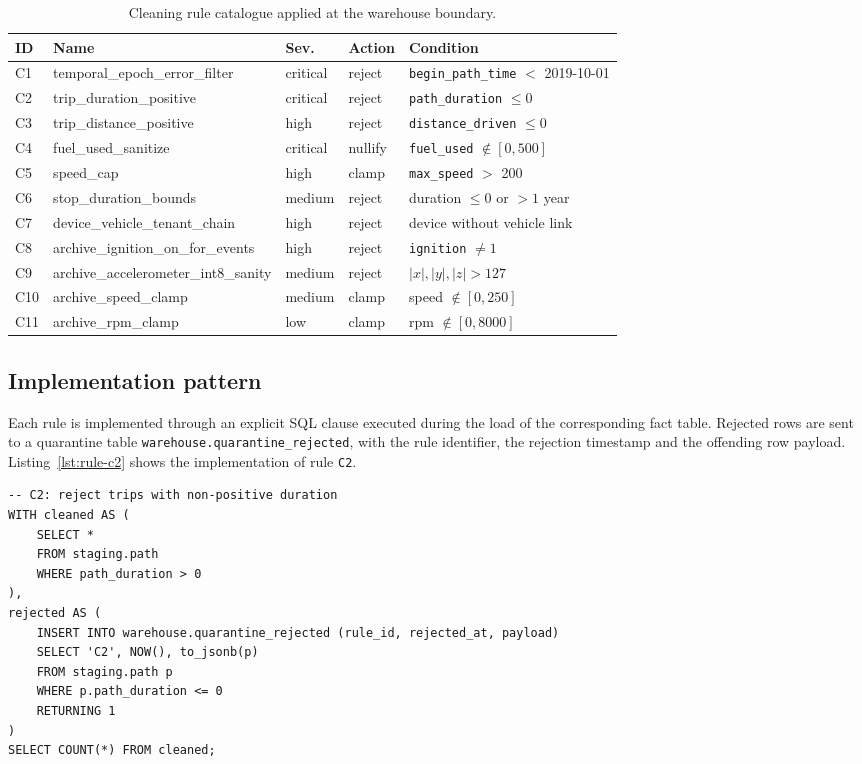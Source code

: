 \begin{table}[h]
\centering
\caption{Cleaning rule catalogue applied at the warehouse boundary.}
\label{tab:rules-prep}
\begin{tabular}{|l|l|l|l|p{5.4cm}|}
\hline
\textbf{ID} & \textbf{Name} & \textbf{Sev.} & \textbf{Action} & \textbf{Condition} \\
\hline
C1 & temporal\_epoch\_error\_filter & critical & reject & \texttt{begin\_path\_time} $<$ 2019-10-01 \\
C2 & trip\_duration\_positive & critical & reject & \texttt{path\_duration} $\le 0$ \\
C3 & trip\_distance\_positive & high & reject & \texttt{distance\_driven} $\le 0$ \\
C4 & fuel\_used\_sanitize & critical & nullify & \texttt{fuel\_used} $\notin [0, 500]$ \\
C5 & speed\_cap & high & clamp & \texttt{max\_speed} $>$ 200 \\
C6 & stop\_duration\_bounds & medium & reject & duration $\le 0$ or $> 1$ year \\
C7 & device\_vehicle\_tenant\_chain & high & reject & device without vehicle link \\
C8 & archive\_ignition\_on\_for\_events & high & reject & \texttt{ignition} $\ne 1$ \\
C9 & archive\_accelerometer\_int8\_sanity & medium & reject & $|x|, |y|, |z| > 127$ \\
C10 & archive\_speed\_clamp & medium & clamp & speed $\notin [0, 250]$ \\
C11 & archive\_rpm\_clamp & low & clamp & rpm $\notin [0, 8000]$ \\
\hline
\end{tabular}
\end{table}

\subsection{Implementation pattern}
Each rule is implemented through an explicit SQL clause executed during the load of the corresponding fact table. Rejected rows are sent to a quarantine table \texttt{warehouse.quarantine\_rejected}, with the rule identifier, the rejection timestamp and the offending row payload. Listing~\ref{lst:rule-c2} shows the implementation of rule \texttt{C2}.

\begin{lstlisting}[style=sql,caption={Implementation of cleaning rule \texttt{C2} (positive trip duration).},label={lst:rule-c2}]
-- C2: reject trips with non-positive duration
WITH cleaned AS (
    SELECT *
    FROM staging.path
    WHERE path_duration > 0
),
rejected AS (
    INSERT INTO warehouse.quarantine_rejected (rule_id, rejected_at, payload)
    SELECT 'C2', NOW(), to_jsonb(p)
    FROM staging.path p
    WHERE p.path_duration <= 0
    RETURNING 1
)
SELECT COUNT(*) FROM cleaned;
\end{lstlisting}

